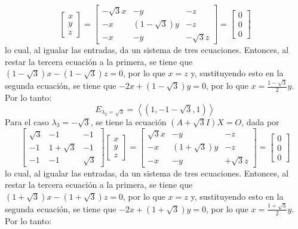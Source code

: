 \begin{solucion}
\begin{equation*}
\begin{bmatrix}
   x \\ y \\ z
  \end{bmatrix}
  = 
  \begin{bmatrix}
   -\sqrt{3}x & -y & -z \\
   -x & (1-\sqrt{3})y & -z \\
   -x & -y & -\sqrt{3}z
  \end{bmatrix}
  = 
  \begin{bmatrix}
   0 \\ 0 \\ 0
  \end{bmatrix}
 \end{equation*}
 lo cual, al igualar las entradas, da un sistema de tres ecuaciones.
 Entonces, al restar la tercera ecuaci\'on a la primera, se tiene que $(1-\sqrt{3})x - (1-\sqrt{3})z = 0$, por lo que $x=z$ y, sustituyendo esto en la segunda ecuaci\'on, se tiene que $-2x + (1-\sqrt{3})y = 0$, por lo que $x = \frac{1-\sqrt{3}}{2}y$. Por lo tanto:
 \begin{equation*}
  E_{\lambda_2 = \sqrt{3}} = \left< (1,-1-\sqrt{3},1) \right>
 \end{equation*}
 Para el caso $\lambda_3 = -\sqrt{3}$, se tiene la ecuaci\'on $(A+\sqrt{3}I)X = O$, dada por
 \begin{equation*}
  \begin{bmatrix}
   \sqrt{3} & -1 & -1 \\
   -1 &  1+\sqrt{3} & -1 \\
   -1 & -1 & \sqrt{3}
  \end{bmatrix}
  \begin{bmatrix}
   x \\ y \\ z
  \end{bmatrix}
  = 
  \begin{bmatrix}
   \sqrt{3}x & -y & -z \\
   -x & (1+\sqrt{3})y & -z \\
   -x & -y & +\sqrt{3}z
  \end{bmatrix}
  = 
  \begin{bmatrix}
   0 \\ 0 \\ 0
  \end{bmatrix}
 \end{equation*}
 lo cual, al igualar las entradas, da un sistema de tres ecuaciones.
 Entonces, al restar la tercera ecuaci\'on a la primera, se tiene que $(1+\sqrt{3})x - (1+\sqrt{3})z = 0$, por lo que $x=z$ y, sustituyendo esto en la segunda ecuaci\'on, se tiene que $-2x + (1+\sqrt{3})y = 0$, por lo que $x = \frac{1+\sqrt{3}}{2}y$. Por lo tanto:

\end{solucion}
